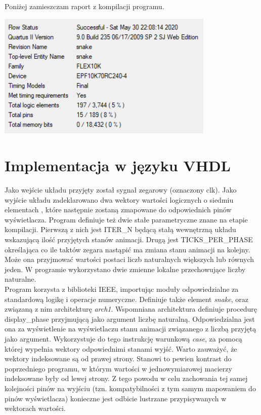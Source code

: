 \documentclass{article}
\begin{document}
        Poniżej zamieszczam raport z kompilacji programu. 
        \begin{center}
            \includegraphics[height=6cm]{reports/img/fpga_comp_verilog.png}\\
        \end{center}

    \section{Implementacja w języku VHDL}
        Jako wejście układu przyjęty został sygnał zegarowy (oznaczony clk). Jako wyjście układu zadeklarowano dwa wektory wartości logicznych o siedmiu elementach , które następnie zostaną zmapowane do odpowiednich pinów wyświetlacza. Program definiuje też dwie stałe parametryczne znane na etapie kompilacji. Pierwszą z nich jest ITER\_N będącą stałą wewnętrzną układu wskazującą ilość przyjętych stanów animacji. Drugą jest TICKS\_PER\_PHASE określająca co ile taktów zegara nastąpić ma zmiana stanu animacji na kolejny. Może ona przyjmować wartości postaci liczb naturalnych większych lub równych jeden. W programie wykorzystano dwie zmienne lokalne przechowujące liczby naturalne.\\
        
        Program korzysta z biblioteki IEEE, importując moduły odpowiedzialne za standardową logikę i operacje numeryczne. Definiuje także element \textit{snake}, oraz związaną z nim architekturę \textit{arch1}. Wspomniana architektura definiuje procedurę display\_phase przyjmującą jako argument liczbę naturalną. Odpowiedzialna jest ona za wyświetlenie na wyświetlaczu stanu animacji związanego z liczbą przyjętą jako argument. Wykorzystuje do tego instrukcję warunkową \textit{case}, za pomocą której wypełnia wektory odpowiednimi stanami wyjść. Warto zauważyć, że wektory indeksowane są od prawej strony. Stanowi to pewien kontrast do poprzedniego programu, w którym wartości w jednowymiarowej macierzy indeksowane były od lewej strony. Z tego powodu w celu zachowania tej samej kolejności pinów na wyjściu (tzn. kompatybilności z tym samym mapowaniem do pinów wyświetlacza) konieczne jest odbicie lustrzane przypisywanych w wektorach wartości. \\
        
\end{document}
